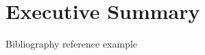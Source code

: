\section{Executive Summary}

\blindtext

Bibliography reference example \autocite{adams1995hitchhiker}
